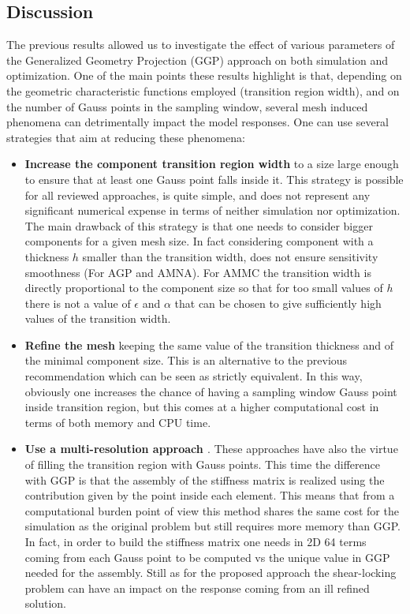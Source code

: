 \subsection{Discussion}
\label{D}
The previous results allowed us to investigate the effect of various parameters of the Generalized Geometry Projection (GGP) approach on both simulation and optimization. One of the main points these results highlight is that, depending on the geometric characteristic functions employed (transition region width), and on the number of Gauss points in the sampling window, several mesh induced phenomena can detrimentally impact the model responses. One can use several strategies that aim at reducing these phenomena:
\begin{itemize}
\item \textbf{Increase the component transition region width} to a size large enough to ensure that at least one Gauss point falls inside it. This strategy is possible for all reviewed approaches, is quite simple, and does not represent any significant numerical expense in terms of neither simulation nor optimization. The main drawback of this strategy is that one needs to consider bigger components for a given mesh size. In fact considering component with a thickness $h$ smaller than the transition width, does not ensure sensitivity smoothness (For AGP and AMNA). For AMMC the transition width is directly proportional to the component size so that for too small values of $h$ there is not a value of $\epsilon$ and $\alpha$ that can be chosen to give sufficiently high values of the transition width.
\item \textbf{Refine the mesh} keeping the same value of the transition thickness and of the minimal component size. This is an alternative to the previous recommendation which can be seen as strictly equivalent. In this way, obviously one increases the chance of having a sampling window Gauss point inside transition region, but this comes at a higher computational cost in terms of both memory and CPU time.
\item \textbf{Use a multi-resolution approach \cite{liu2018efficient}}. These approaches have also the virtue of filling the transition region with Gauss points. This time the difference with GGP is that the assembly of the stiffness matrix is realized using the contribution given by the point inside each element. This means that from a computational burden point of view this method shares the same cost for the simulation as the original problem but still requires more memory than GGP. In fact, in order to build the stiffness matrix one needs in 2D 64 terms coming from each Gauss point to be computed vs the unique value in GGP needed for the assembly. Still as for the proposed approach the shear-locking problem can have an impact on the response coming from an ill refined solution.

\end{itemize}
